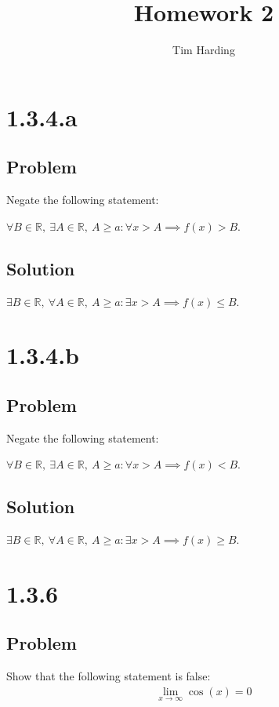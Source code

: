\documentclass[12pt]{article}
\title{Homework 2}
\author{Tim Harding}
\begin{document}
\maketitle

\section*{1.3.4.a}

\subsection*{Problem}
Negate the following statement:

$\forall B \in \mathbb{R},\ \exists A \in \mathbb{R},\ A \geq a : \forall x > A \implies f(x) > B$.

\subsection*{Solution}
$\exists B \in \mathbb{R},\ \forall A \in \mathbb{R},\ A \geq a : \exists x > A \implies f(x) \leq B$.



\section*{1.3.4.b}

\subsection*{Problem}
Negate the following statement:

$\forall B \in \mathbb{R},\ \exists A \in \mathbb{R},\ A \geq a : \forall x > A \implies f(x) < B$.

\subsection*{Solution}
$\exists B \in \mathbb{R},\ \forall A \in \mathbb{R},\ A \geq a : \exists x > A \implies f(x) \geq B$.



\section*{1.3.6}

\subsection*{Problem}
Show that the following statement is false:
\begin{align*}
    \lim_{x \to \infty} \cos(x) = 0
\end{align*}
\end{document}
